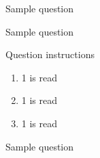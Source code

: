 \documentclass[11pt]{exam}
\begin{document}
\begin{questions}
	\question Sample question

	\begin{framed}
		
		
	\end{framed}


	\question Sample question

	Question instructions
        \begin{enumerate}[label=(\roman*)]
            \item 1 is read
                \begin{framed}
                \end{framed}
            \item 1 is read
                \begin{framed}
                \end{framed}
            \item 1 is read
                \begin{framed}
                \end{framed}
        \end{enumerate}


	\question Sample question

	\begin{framed}
		
		
	\end{framed}

\end{questions}
\end{document}
